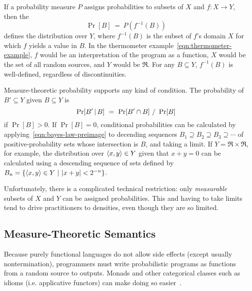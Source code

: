 \documentclass{llncs}
\begin{document}
If a probability measure $P$ assigns probabilities to subsets of $X$ and $f : X \to Y$, then the 
\begin{equation}
	\Pr[B] \ = \ P(f^{-1}(B))
\end{equation}
defines the distribution over $Y$, where $f^{-1}(B)$ is the subset of $f$'s domain $X$ for which $f$ yields a value in $B$.
In the thermometer example~\eqref{eqn:thermometer-example}, $f$ would be an interpretation of the program as a function, $X$ would be the set of all random sources, and $Y$ would be $\Re$.
For any $B \subseteq Y$, $f^{-1}(B)$ is well-defined, regardless of discontinuities.

Measure-theoretic probability supports any kind of condition.
The probability of $B' \subseteq Y$ given $B \subseteq Y$ is
\begin{equation}
	\Pr[B'\,|\,B]\ =\ \Pr[B' \i B]\ /\ \Pr[B]
\label{eqn:bayes-law-preimage}
\end{equation}
if $\Pr[B] > \mathrm{0}$.
If $\Pr[B] = \mathrm{0}$, conditional probabilities can be calculated by applying~\eqref{eqn:bayes-law-preimage} to decending sequences $B_1 \supseteq B_2 \supseteq B_3 \supseteq \cdots$ of positive-probability sets whose intersection is $B$, and taking a limit.
If $Y = \Re \times \Re$, for example, the distribution over $\langle{x,y}\rangle \in Y$ given that $x + y = \mathrm{0}$ can be calculated using a descending sequence of sets defined by $B_n = \lbrace {\langle{x,y}\rangle \in Y} \ \lvert\ {|x + y| < \mathrm{2}^{-n}} \rbrace$.

Unfortunately, there is a complicated technical restriction: only \emph{measurable} subsets of $X$ and $Y$ can be assigned probabilities.
This and having to take limits tend to drive practitioners to densities, even though they are so limited.

\subsection{Measure-Theoretic Semantics}

Because purely functional languages do not allow side effects (except usually nontermination), programmers must write probabilistic programs as functions from a random source to outputs.
Monads and other categorical classes such as idioms (i.e. applicative functors) can make doing so easier~\cite{cit:toronto-2010ifl-bayes,cit:hurd-2002thesis}.
\end{document}
